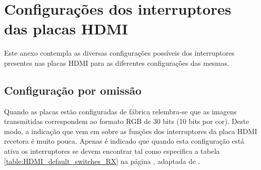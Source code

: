 {\tiny \chapter{Configurações dos interruptores das placas HDMI} \label{ap4:switches}}

Este anexo contempla as diversas configurações possíveis dos interruptores presentes nas placas HDMI para as diferentes configurações das mesmas.

\section{Configuração por omissão} \label{subsubsec:HDMIconfigdefault_switches}

Quando as placas estão configuradas de fábrica relembra-se que as imagens transmitidas correspondem ao formato RGB de 30 bits (10 bits por cor). Deste modo, a indicação que vem em \cite{R009} sobre as funções dos interruptores da placa HDMI recetora é muito pouca. Apenas é indicado que quando esta configuração está ativa os interruptores se devem encontrar tal como especifica a tabela \ref{table:HDMI_default_switches_RX} na página \pageref{table:HDMI_default_switches_RX}, adaptada de \cite{R009}.



